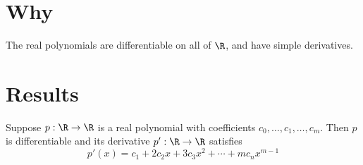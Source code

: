 
\section*{Why}

The real polynomials are differentiable on all of $\R $, and have simple derivatives.

\section*{Results}

\begin{proposition}
Suppose $p: \R  \to \R $ is a real polynomial with coefficients $c_0, \dots , c_1, \dots , c_m$.
Then $p$ is differentiable and its derivative $p': \R  \to \R $ satisfies
\[
p'(x) = c_1 + 2c_2x + 3c_3x^2 + \cdots + mc_nx^{m-1}
\]
\end{proposition}

\blankpage